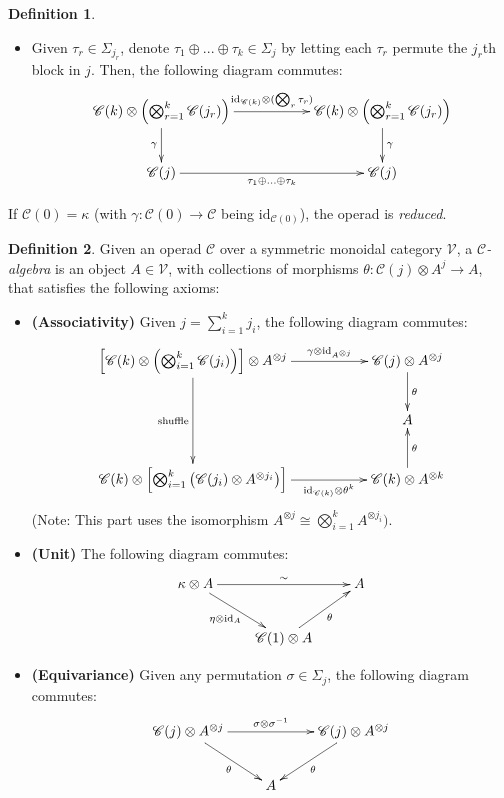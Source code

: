 \documentclass[openany, amssymb, psamsfonts]{amsart}
\theoremstyle{definition}
\newtheorem{defn}{Definition}[section]
\numberwithin{equation}{section}
\newcommand{\C}{\mathscr{C}}
\newcommand{\id}{\mathrm{id}} %
\newcommand{\tensor}{\otimes} %
\newcommand{\bigtensor}{\bigotimes} %
\begin{document}
\begin{defn}
\begin{itemize}
\begin{itemize}
\[{            \C(j) \ar[rr]_-{\sigma(j_{\sigma(1)},...,j_{\sigma(k)})} && \C(j)
        }\]
        \item Given $\tau_r\in \Sigma_{j_r}$, denote $\tau_1\oplus ... \oplus \tau_k\in \Sigma_j$ by letting each $\tau_r$ permute the $j_r$th block in $j$. 
        Then, the following diagram commutes:
        \[\xymatrix{
            \C(k)\tensor \left(\bigtensor_{r=1}^k \C(j_r)\right)\ar[d]_-{\gamma} \ar[rr]^-{\id_{\C(k)}\tensor (\bigtensor_r \tau_r)} && \C(k)\tensor \left(\bigtensor_{r=1}^k \C(j_r)\right) \ar[d]^-{\gamma}\\
            \C(j) \ar[rr]_{\tau_1\oplus...\oplus\tau_k} && \C(j)
        }\]
    \end{itemize}
\end{itemize}

If $\C(0)=\kappa$ (with $\gamma:\C(0)\rightarrow \C$ being $\id_{\C(0)}$), the operad is \emph{reduced}.
\end{defn}

\begin{defn}\label{defn_operad_alg}
    Given an operad $\C$ over a symmetric monoidal category $\mathcal{V}$, a \emph{$\C$-algebra} is an object $A\in\mathcal{V}$, with collections of morphisms $\theta:\C(j)\tensor A^j\rightarrow A$, that satisfies the following axioms:
    \begin{itemize}
        \item \textbf{(Associativity)} Given $j = \sum_{i=1}^k j_i$, the following diagram commutes:
        \[\xymatrix{
            \left[\C(k)\tensor \left(\bigtensor_{i=1}^k \C(j_i)\right)\right] \tensor A^{\tensor j} \ar[dd]_-{\text{shuffle}} \ar[rr]^-{\gamma\tensor \id_{A^{\tensor j}}} && \C(j)\tensor A^{\tensor j} \ar[d]^-{\theta}\\
            & & A\\
            \C(k)\tensor \left[\bigtensor_{i=1}^k \left(\C(j_i)\tensor A^{\tensor j_i}\right)\right] \ar[rr]_-{\id_{\C(k)}\tensor \theta^k} && \C(k)\tensor A^{\tensor k} \ar[u]_-{\theta}
        }\]
        (Note: This part uses the isomorphism $A^{\tensor j}\cong\bigtensor_{i=1}^k A^{\tensor j_i})$.
        \item \textbf{(Unit)} The following diagram commutes:
        \[\xymatrix{
            \kappa \tensor A \ar[dr]_-{\eta\tensor \id_A} \ar[rr]^-{\sim} && A\\
            & \C(1)\tensor A \ar[ur]_-{\theta}
        }\]
        \item \textbf{(Equivariance)} Given any permutation $\sigma\in\Sigma_j$, the following diagram commutes:
        \[\xymatrix{
            \C(j)\tensor A^{\tensor j} \ar[dr]_-{\theta} \ar[rr]^-{\sigma\tensor \sigma^{-1}} && \C(j)\tensor A^{\tensor j} \ar[dl]^-{\theta}\\
            & A
        }\]
    \end{itemize}
\end{defn}
\end{document}
